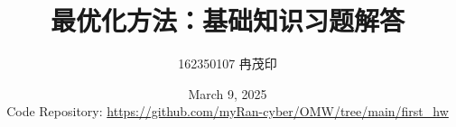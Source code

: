 \documentclass[UTF8]{ctexart}
\title{最优化方法：基础知识习题解答}
\author{162350107 冉茂印}
\date{March 9, 2025 \\ Code Repository: \url{https://github.com/myRan-cyber/OMW/tree/main/first_hw}}
\begin{document}
\maketitle


\\
\\

































\end{document}
